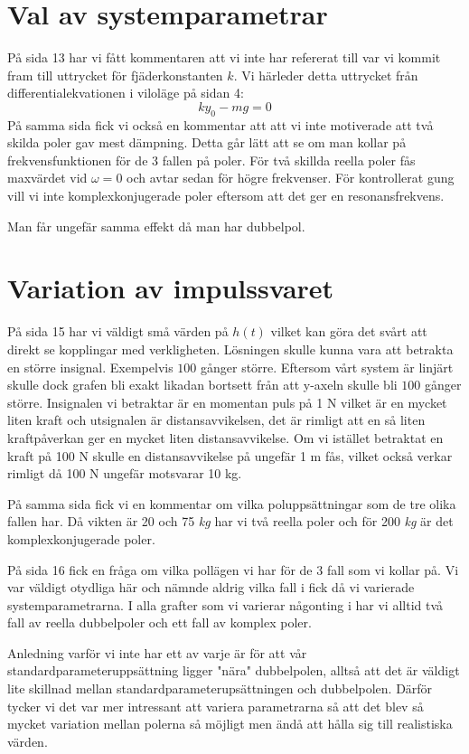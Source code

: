 \documentclass[usenames,dvipsnames]{article}
\begin{document}
\section{Val av systemparametrar}
På sida 13 har vi fått kommentaren att vi inte har refererat till var vi kommit fram till uttrycket för fjäderkonstanten $k$. Vi härleder detta uttrycket från differentialekvationen i viloläge på sidan 4:
$$ky_0-mg=0$$
På samma sida fick vi också en kommentar att att vi inte motiverade att två skilda poler gav mest dämpning.
Detta går lätt att se om man kollar på frekvensfunktionen för de 3 fallen på poler. För två skillda reella poler fås maxvärdet vid $\omega=0$ och avtar sedan för högre frekvenser. För kontrollerat gung vill vi inte komplexkonjugerade poler eftersom att det ger en resonansfrekvens.


Man får ungefär samma effekt då man har dubbelpol.

\section{Variation av impulssvaret}
På sida 15 har vi väldigt små värden på $h(t)$ vilket kan göra det svårt att direkt se kopplingar med verkligheten. Lösningen skulle kunna vara att betrakta en större insignal. Exempelvis $100$ gånger större. Eftersom vårt system är linjärt skulle dock grafen bli exakt likadan bortsett från att y-axeln skulle bli $100$ gånger större. Insignalen vi betraktar är en momentan puls på 1 N vilket är en mycket liten kraft och utsignalen är distansavvikelsen, det är rimligt att en så liten kraftpåverkan ger en mycket liten distansavvikelse. Om vi istället betraktat en kraft på 100 N skulle en distansavvikelse på ungefär 1 m fås, vilket också verkar rimligt då 100 N ungefär motsvarar 10 kg.

På samma sida fick vi en kommentar om vilka poluppsättningar som de tre olika fallen har. Då vikten är 20 och 75 \textit{kg} har vi två reella poler och för 200 \textit{kg} är det komplexkonjugerade poler.

På sida 16 fick en fråga om vilka pollägen vi har för de 3 fall som vi kollar på. Vi var väldigt otydliga här och nämnde aldrig vilka fall i fick då vi varierade systemparametrarna. I alla grafter som vi varierar någonting i har vi alltid två fall av reella dubbelpoler och ett fall av komplex poler.

Anledning varför vi inte har ett av varje är för att vår standardparameteruppsättning ligger "nära" dubbelpolen, alltså att det är väldigt lite skillnad mellan standardparameterupsättningen och dubbelpolen. Därför tycker vi det var mer intressant att variera parametrarna så att det blev så mycket variation mellan polerna så möjligt men ändå att hålla sig till realistiska värden.
\end{document}
